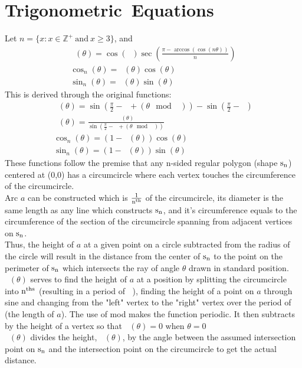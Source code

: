\documentclass[11pt]{article}
\DeclareMathOperator{\custd}{\mathrm{d}_n}
\DeclareMathOperator{\custh}{\mathrm{h}_n}
\DeclareMathOperator{\period}{\frac{2\pi}{n}}
\DeclareMathOperator{\hp}{\frac{\pi}{n}}
\begin{document}
\section{Trigonometric\ Equations}
Let \(n=\{x:x\in\mathbb{Z}^+\ \mathrm{and}\ x\geq3\}\), and
\begin{gather*}
\custd(\theta)=\cos(\hp)\sec(\frac{\pi - \arccos(\cos(n\theta))}{n})\\
\cos_n(\theta)=\custd(\theta)\cos(\theta)\\
\sin_n(\theta)=\custd(\theta)\sin(\theta)
\end{gather*}
This is derived through the original functions:
\begin{gather*}
\custh(\theta)=\sin(\frac{\pi}{2}-\hp+(\theta\mod\period))-\sin(\frac{\pi}{2}-\hp)\\
\custd(\theta)=\frac{\custh(\theta)}{\sin(\frac{\pi}{2}-\hp+(\theta\mod\period))}\\
\cos_n(\theta)=(1-\custd(\theta))\cos(\theta)\\
\sin_n(\theta)=(1-\custd(\theta))\sin(\theta)
\end{gather*}
These functions follow the premise that any n-sided regular polygon (shape \(\rm s_n\)) centered at (0,0) has a circumcircle where each vertex touches the circumference of the circumcircle. \\
Arc \(a\) can be constructed which is \(\rm \frac{1}{n^{th}}\) of the circumcircle, its diameter is the same length as any line which constructs \(\rm s_n\), and it's circumference equals to the circumference of the section of the circumcircle spanning from adjacent vertices on \(\rm s_n\). \\
Thus, the height of \(a\) at a given point on a circle subtracted from the radius of the circle will result in the distance from the center of \(\rm s_n\) to the point on the perimeter of \(\rm s_n\) which intersects the ray of angle \(\theta\) drawn in standard position.\\
\(\custh(\theta)\) serves to find the height of \(a\) at a position by splitting the circumcircle into \(\rm n^{ths}\) (resulting in a period of \(\period\)), finding the height of a point on \(a\) through sine and changing from the "left" vertex to the "right" vertex over the period of \(\period\) (the length of \(a\)). The use of mod makes the function periodic. It then subtracts by the height of a vertex so that \(\custh(\theta)=0\) when \(\theta=0\)\\
\(\custd(\theta)\) divides the height, \(\custh(\theta)\), by the angle between the assumed intersection point on \(\rm s_n\) and the intersection point on the circumcircle to get the actual distance.\\
\end{document}
